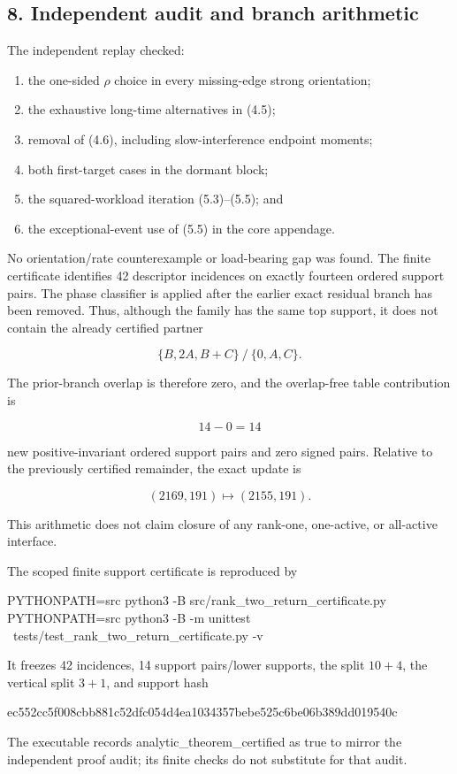 \subsection{8. Independent audit and branch
arithmetic}

The independent replay checked:

\begin{enumerate}
\def\labelenumi{\arabic{enumi}.}
\tightlist
\item
  the one-sided \(\rho\) choice in every missing-edge strong
  orientation;
\item
  the exhaustive long-time alternatives in (4.5);
\item
  removal of (4.6), including slow-interference endpoint moments;
\item
  both first-target cases in the dormant block;
\item
  the squared-workload iteration (5.3)--(5.5); and
\item
  the exceptional-event use of (5.5) in the core appendage.
\end{enumerate}

No orientation/rate counterexample or load-bearing gap was found. The
finite certificate identifies 42 descriptor incidences on exactly
fourteen ordered support pairs. The phase classifier is applied after
the earlier exact residual branch has been removed. Thus, although the
family has the same top support, it does not contain the already
certified partner

\[
 \{B,2A,B+C\}\ /\ \{0,A,C\}.
\]

The prior-branch overlap is therefore zero, and the overlap-free table
contribution is

\[
 14-0=14
\]

new positive-invariant ordered support pairs and zero signed pairs.
Relative to the previously certified remainder, the exact update is

\[
 (2169,191)\longmapsto(2155,191).                        \tag{8.1}
\]

This arithmetic does not claim closure of any rank-one, one-active, or
all-active interface.

The scoped finite support certificate is reproduced by

\begin{CodeBlock}
PYTHONPATH=src python3 -B src/rank_two_return_certificate.py
PYTHONPATH=src python3 -B -m unittest \
  tests/test_rank_two_return_certificate.py -v
\end{CodeBlock}

It freezes 42 incidences, 14 support pairs/lower supports, the split
\(10+4\), the vertical split \(3+1\), and support hash

\begin{CodeBlock}
ec552cc5f008cbb881c52dfc054d4ea1034357bebe525c6be06b389dd019540c
\end{CodeBlock}

The executable records analytic\_theorem\_certified as true to mirror
the independent proof audit; its finite checks do not substitute for
that audit.
